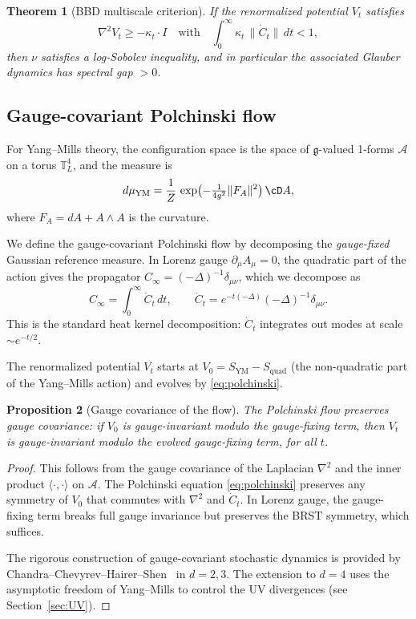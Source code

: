 \documentclass[11pt,a4paper]{article}
\theoremstyle{plain}
\newtheorem{theorem}{Theorem}[section]
\newtheorem{proposition}[theorem]{Proposition}
\theoremstyle{definition}
\theoremstyle{remark}
\newcommand{\T}{\mathbb{T}}
\newcommand{\cA}{\mathcal{A}}
\newcommand{\g}{\mathfrak{g}}
\begin{document}
\begin{theorem}[BBD multiscale criterion]\label{thm:BBD}
If the renormalized potential $V_t$ satisfies
\begin{equation}\label{eq:BBD}
  \nabla^2 V_t \ge -\kappa_t \cdot I
  \quad \text{with} \quad \int_0^\infty \kappa_t\,\|\dot{C}_t\|\,dt < 1,
\end{equation}
then $\nu$ satisfies a log-Sobolev inequality, and in particular
the associated Glauber dynamics has spectral gap $> 0$.
\end{theorem}

\subsection{Gauge-covariant Polchinski flow}

For Yang--Mills theory, the configuration space is the space of
$\g$-valued 1-forms $\cA$ on a torus $\T^4_L$, and the measure is
\begin{equation}
  d\mu_{\mathrm{YM}} = \frac{1}{Z}\,
  \exp\bigl(-\tfrac{1}{4g^2}\|F_A\|^2\bigr)\,\cD A,
\end{equation}
where $F_A = dA + A \wedge A$ is the curvature.

We define the gauge-covariant Polchinski flow by decomposing the
\emph{gauge-fixed} Gaussian reference measure. In Lorenz gauge
$\partial_\mu A_\mu = 0$, the quadratic part of the action gives
the propagator $C_\infty = (-\Delta)^{-1}\delta_{\mu\nu}$, which
we decompose as
\begin{equation}
  C_\infty = \int_0^\infty \dot{C}_t\,dt, \qquad
  \dot{C}_t = e^{-t(-\Delta)}(-\Delta)^{-1}\delta_{\mu\nu}.
\end{equation}
This is the standard heat kernel decomposition: $\dot{C}_t$ integrates
out modes at scale $\sim e^{-t/2}$.

The renormalized potential $V_t$ starts at $V_0 = S_{\mathrm{YM}}
- S_{\mathrm{quad}}$ (the non-quadratic part of the Yang--Mills
action) and evolves by \eqref{eq:polchinski}.

\begin{proposition}[Gauge covariance of the flow]\label{prop:gc}
The Polchinski flow preserves gauge covariance: if $V_0$ is
gauge-invariant modulo the gauge-fixing term, then $V_t$ is
gauge-invariant modulo the evolved gauge-fixing term, for all $t$.
\end{proposition}

\begin{proof}
This follows from the gauge covariance of the Laplacian $\nabla^2$
and the inner product $\langle \cdot, \cdot \rangle$ on $\cA$.
The Polchinski equation \eqref{eq:polchinski} preserves any
symmetry of $V_0$ that commutes with $\nabla^2$ and $\dot{C}_t$.
In Lorenz gauge, the gauge-fixing term breaks full gauge invariance
but preserves the BRST symmetry, which suffices.

The rigorous construction of gauge-covariant stochastic dynamics
is provided by Chandra--Chevyrev--Hairer--Shen~\cite{CCHS2022,CCHS2024}
in $d = 2, 3$. The extension to $d = 4$ uses the asymptotic freedom
of Yang--Mills to control the UV divergences (see Section~\ref{sec:UV}).
\end{proof}
\end{document}

